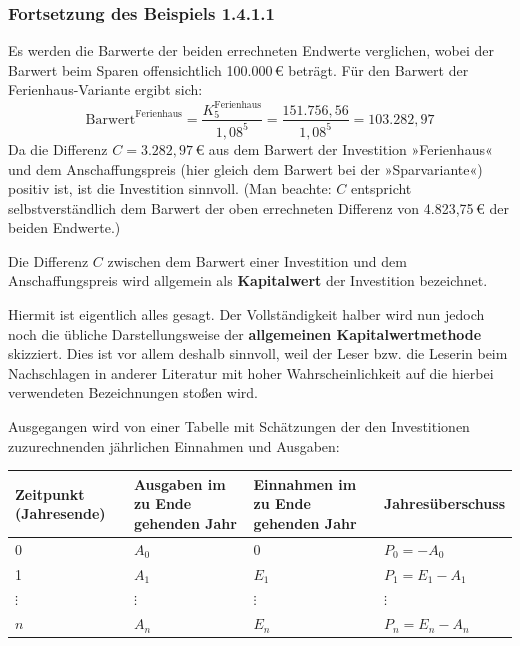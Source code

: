 \subsubsection{Fortsetzung des Beispiels 1.4.1.1}

Es werden die Barwerte der beiden errechneten Endwerte verglichen, wobei der Barwert beim Sparen offensichtlich 100.000\,€ beträgt. Für den Barwert der Ferienhaus-Variante ergibt sich:
\[ \text{Barwert}^{\text{Ferienhaus}} = \frac{K_5^{\text{Ferienhaus}}}{1{,}08^5} = \frac{151.756{,}56}{1{,}08^5} = 103.282{,}97 \]
Da die Differenz $C = 3.282{,}97\,€$ aus dem Barwert der Investition »Ferienhaus« und dem Anschaffungspreis (hier gleich dem Barwert bei der »Sparvariante«) positiv ist, ist die Investition sinnvoll. (Man beachte: $C$ entspricht selbstverständlich dem Barwert der oben errechneten Differenz von 4.823{,}75\,€ der beiden Endwerte.)\beispielende

Die Differenz $C$ zwischen dem Barwert einer Investition und dem Anschaffungspreis wird allgemein als \textbf{Kapitalwert} der Investition bezeichnet.


Hiermit ist eigentlich alles gesagt. Der Vollständigkeit halber wird nun jedoch noch die übliche Darstellungsweise der \textbf{allgemeinen Kapitalwertmethode} skizziert. Dies ist vor allem deshalb sinnvoll, weil der Leser bzw. die Leserin beim Nachschlagen in anderer Literatur mit hoher Wahrscheinlichkeit auf die hierbei verwendeten Bezeichnungen stoßen wird.

Ausgegangen wird von einer Tabelle mit Schätzungen der den Investitionen zuzurechnenden jährlichen Einnahmen und Ausgaben:

\begin{center}
  \centering
  \begin{tabular}{llll}
    \hline
    Zeitpunkt (Jahresende) & Ausgaben im zu Ende gehenden Jahr & Einnahmen im zu Ende gehenden Jahr & Jahresüberschuss\\
    \hline
    0 & $A_0$ & 0 & $P_0 = -A_0$\\
    1 & $A_1$ & $E_1$ & $P_1 = E_1 - A_1$\\
    $\vdots$ & $\vdots$ & $\vdots$ & $\vdots$\\
    $n$ & $A_n$ & $E_n$ & $P_n = E_n - A_n$\\
    \hline
  \end{tabular}
\end{center}

